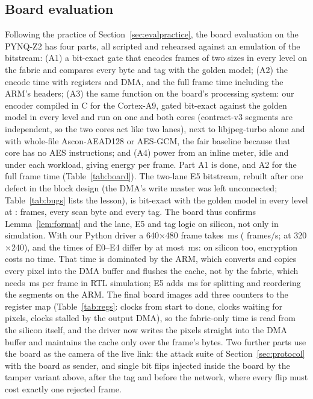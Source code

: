 \subsection{Board evaluation}\label{sec:board}

Following the practice of Section~\ref{sec:evalpractice}, the board evaluation on the PYNQ-Z2 has four parts, all scripted and rehearsed against an emulation of the bitstream: (A1) a bit-exact gate that encodes frames of two sizes in every level on the fabric and compares every byte and tag with the golden model; (A2) the encode time with registers and DMA, and the full frame time including the ARM's headers; (A3) the same function on the board's processing system: our encoder compiled in C for the Cortex-A9, gated bit-exact against the golden model in every level and run on one and both cores (contract-v3 segments are independent, so the two cores act like two lanes), next to libjpeg-turbo alone and with whole-file Ascon-AEAD128 or AES-GCM, the fair baseline because that core has no AES instructions; and (A4) power from an inline meter, idle and under each workload, giving energy per frame. Part A1 is done, and A2 for the full frame time (Table~\ref{tab:board}). The two-lane E5 bitstream, rebuilt after one defect in the block design (the DMA's write master was left unconnected; Table~\ref{tab:bugs} lists the lesson), is bit-exact with the golden model in every level \BoardModes{} at \BoardSizes{}: \BoardFramesTotal{} frames, every scan byte and every tag. The board thus confirms Lemma~\ref{lem:format} and the lane, E5 and tag logic on silicon, not only in simulation. With our Python driver a 640$\times$480 frame takes \BoardMsVGA\,ms (\BoardFpsVGA{} frames/s; \BoardFpsQVGA{} at 320$\times$240), and the times of E0--E4 differ by at most \BoardSpreadMsVGA\,ms: on silicon too, encryption costs no time. That time is dominated by the ARM, which converts and copies every pixel into the DMA buffer and flushes the cache, not by the fabric, which needs \RtlTwoLanesVgaMs\,ms per frame in RTL simulation; E5 adds \BoardEfiveExtraMsVGA\,ms for splitting and reordering the segments on the ARM. The final board images add three counters to the register map (Table~\ref{tab:regs}: clocks from start to done, clocks waiting for pixels, clocks stalled by the output DMA), so the fabric-only time is read from the silicon itself, and the driver now writes the pixels straight into the DMA buffer and maintains the cache only over the frame's bytes.  Two further parts use the board as the camera of the live link: the attack suite of Section~\ref{sec:protocol} with the board as sender, and single bit flips injected inside the board by the tamper variant above, after the tag and before the network, where every flip must cost exactly one rejected frame. 
